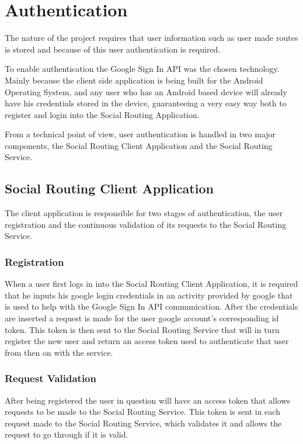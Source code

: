 \chapter{Authentication}

The nature of the project requires that user information such as user made routes is stored and
because of this user authentication is required. 

To enable authentication the Google Sign In API was the chosen technology. Mainly because the client side 
application is being built for the Android Operating System, and any user who has an Android based device 
will already have his credentials stored in the device, guaranteeing a very easy way both to register and 
login into the Social Routing Application.

From a technical point of view, user authentication is handled in two major components, the Social Routing 
Client Application and the Social Routing Service. 

\section{Social Routing Client Application}
    The client application is responsible for two stages of authentication, the user registration and the continuous
    validation of its requests to the Social Routing Service.
    \subsection{Registration}
        When a user first logs in into the Social Routing Client Application, it is required that he inputs his google
        login credentials in an activity provided by google that is used to help with the Google Sign In API communication.
        After the credentials are inserted a request is made for the user google account's corresponding id token.
        This token is then sent to the Social Routing Service that will in turn register the new user and return an
        access token used to authenticate that user from then on with the service. 
    \subsection{Request Validation}
        After being registered the user in question will have an access token that allows requests to be made to 
        the Social Routing Service. This token is sent in each request made to the Social Routing Service, which validates
        it and allows the request to go through if it is valid.  

